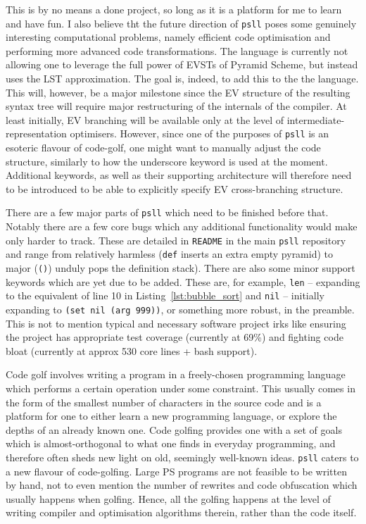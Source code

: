 \documentclass[aip,jcp,reprint,footinbib]{revtex4-1}
\let\tt\texttt
\newcommand\psll{\texttt{psll}\xspace}
\newcommand{\ilpsll}[1]{\lstinline[language=psll,columns=flexible]{#1}}
\begin{document}
This is by no means a done project, so long as it is a platform for me to learn and have fun. I also believe tht the future direction of \psll poses some genuinely interesting computational problems, namely efficient code optimisation and performing more advanced code transformations. The language is currently not allowing one to leverage the full power of EVSTs of Pyramid Scheme, but instead uses the LST approximation. The goal is, indeed, to add this to the the language. This will, however, be a major milestone since the EV structure of the resulting syntax tree will require major restructuring of the internals of the compiler. At least initially, EV branching will be available only at the level of intermediate-representation optimisers. However, since one of the purposes of \psll is an esoteric flavour of code-golf, one might want to manually adjust the code structure, similarly to how the underscore keyword is used at the moment. Additional keywords, as well as their supporting architecture will therefore need to be introduced to be able to explicitly specify EV cross-branching structure.

There are a few major parts of \psll which need to be finished before that. Notably there are a few core bugs which any additional functionality would make only harder to track. These are detailed in \tt{README} in the main \psll repository and range from relatively harmless (\tt{def} inserts an extra empty pyramid) to major (\tt{()}) unduly pops the definition stack). There are also some minor support keywords which are yet due to be added. These are, for example, \tt{len} -- expanding to the equivalent of line 10 in Listing~\ref{lst:bubble_sort} and \tt{nil} -- initially expanding to \ilpsll{(set nil (arg 999))}, or something more robust, in the preamble. This is not to mention typical and necessary software project irks like ensuring the project has appropriate test coverage (currently at 69\%) and fighting code bloat (currently at approx 530 core lines + bash support).

Code golf involves writing a program in a freely-chosen programming language which performs a certain operation under some constraint. This usually comes in the form of the smallest number of characters in the source code and is a platform for one to either learn a new programming language, or explore the depths of an already known one. Code golfing provides one with a set of goals which is almost-orthogonal to what one finds in everyday programming, and therefore often sheds new light on old, seemingly well-known ideas. \psll caters to a new flavour of code-golfing. Large PS programs are not feasible to be written by hand, not to even mention the number of rewrites and code obfuscation which usually happens when golfing. Hence, all the golfing happens at the level of writing compiler and optimisation algorithms therein, rather than the code itself.\cite{psnegation_answer}
\end{document}
